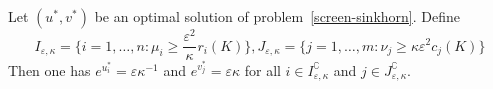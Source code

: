 %
%



\begin{lemma}
\label{lemma_actives_sets}
Let $(u^{*}, v^{*})$ be an optimal solution of problem~\eqref{screen-sinkhorn}. 
Define
\begin{equation}
\label{I_epsilon_kappa_J_epsilon_kappa}
I_{\varepsilon,\kappa} = \big\{i=1, \ldots, n: \mu_i \geq \frac {\varepsilon^2} \kappa^{} r_i(K)\big\}, J_{\varepsilon,\kappa} = \big\{j=1, \ldots, m: \nu_j \geq \kappa{\varepsilon^2}{} c_j(K)\big\}
\end{equation}
Then one has $e^{u^{*}_i} = \varepsilon\kappa^{-1}$ and $e^{v^{*}_j} = \varepsilon\kappa$ for all $i \in I^\complement_{\varepsilon,\kappa} $ and $j\in J^\complement_{\varepsilon,\kappa} .$
\end{lemma}

